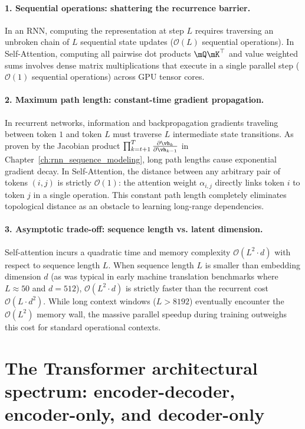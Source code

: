 \documentclass[../../main.tex]{subfiles}
\begin{document}
\paragraph{1. Sequential operations: shattering the recurrence barrier.}
In an RNN, computing the representation at step $L$ requires traversing an unbroken chain of $L$ sequential state updates ($\mathcal{O}(L)$ sequential operations).
In Self-Attention, computing all pairwise dot products $\mQ \mK^\top$ and value weighted sums involves dense matrix multiplications that execute in a single parallel step ($\mathcal{O}(1)$ sequential operations) across GPU tensor cores.

\paragraph{2. Maximum path length: constant-time gradient propagation.}
In recurrent networks, information and backpropagation gradients traveling between token $1$ and token $L$ must traverse $L$ intermediate state transitions. As proven by the Jacobian product $\prod_{k=t+1}^T \frac{\partial \vh_k}{\partial \vh_{k-1}}$ in Chapter~\ref{ch:rnn_sequence_modeling}, long path lengths cause exponential gradient decay.
In Self-Attention, the distance between any arbitrary pair of tokens $(i, j)$ is strictly $\mathcal{O}(1)$: the attention weight $\alpha_{i, j}$ directly links token $i$ to token $j$ in a single operation. This constant path length completely eliminates topological distance as an obstacle to learning long-range dependencies.

\paragraph{3. Asymptotic trade-off: sequence length vs. latent dimension.}
Self-attention incurs a quadratic time and memory complexity $\mathcal{O}(L^2 \cdot d)$ with respect to sequence length $L$.
When sequence length $L$ is smaller than embedding dimension $d$ (as was typical in early machine translation benchmarks where $L \approx 50$ and $d = 512$), $\mathcal{O}(L^2 \cdot d)$ is strictly faster than the recurrent cost $\mathcal{O}(L \cdot d^2)$. While long context windows ($L > 8192$) eventually encounter the $\mathcal{O}(L^2)$ memory wall, the massive parallel speedup during training outweighs this cost for standard operational contexts.

\section{The Transformer architectural spectrum: encoder-decoder, encoder-only, and decoder-only}
\label{sec:architectural_spectrum}
\end{document}
